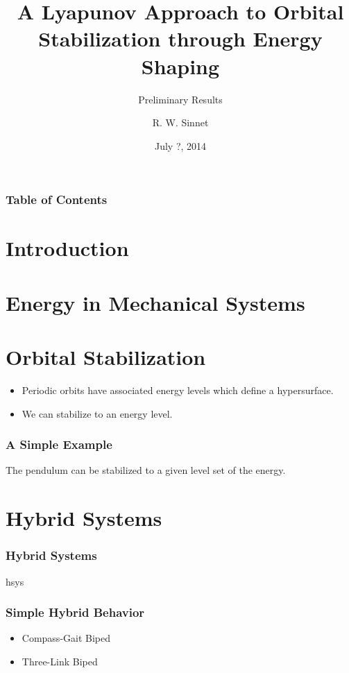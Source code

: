 \documentclass{beamer}
\title[Energy Shaping]{A Lyapunov Approach to Orbital \\Stabilization through Energy Shaping}
\subtitle{Preliminary Results}
\author{R. W. Sinnet}
\institute{Department of Mechanical Engineering\\ Texas A\&M University}
\date{July ?, 2014}
\begin{document}
\frame{\titlepage}

\begin{frame}
  \frametitle{Table of Contents}
  \tableofcontents
\end{frame}

\section{Introduction}

\section{Energy in Mechanical Systems}



\section{Orbital Stabilization}
\begin{frame}
  \begin{itemize}
    \item Periodic orbits have associated energy levels which define a hypersurface.
    \item We can stabilize to an energy level.
  \end{itemize}
\end{frame}

\begin{frame}
  \frametitle{A Simple Example}
  The pendulum can be stabilized to a given level set of the energy.
\end{frame}


\section{Hybrid Systems}
\begin{frame}
  \frametitle{Hybrid Systems}
  hsys
\end{frame}

\begin{frame}
  \frametitle{Simple Hybrid Behavior}
  \begin{itemize}
    \item Compass-Gait Biped
    \item Three-Link Biped
  \end{itemize}
\end{frame}
\end{document}
